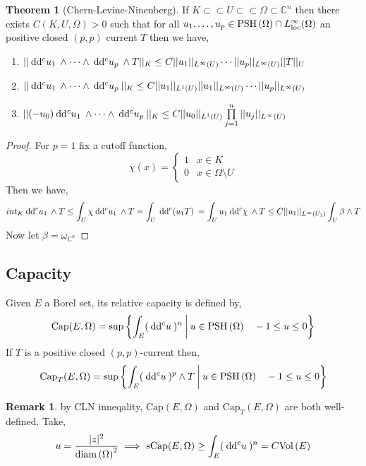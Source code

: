 \documentclass[12pt]{extarticle}
\newcommand{\C}{\mathbb{C}}
\renewcommand{\d}[1]{\: \mathrm{d}#1 \:}
\theoremstyle{definition}
\newtheorem{theorem}{Theorem}[section]
\newtheorem{remark}{Remark}
\newenvironment{definition}[1][Definition:]{\begin{trivlist}
\item[\hskip \labelsep {\bfseries #1}]}{\end{trivlist}}
\begin{document}
\begin{theorem}[Chern-Levine-Ninenberg]
If $K \subset \subset U \subset \subset \Omega \subset \C^n$ then there exists $C(K, U, \Omega) > 0$ such that for all $u_1, \dots, u_p \in \mathrm{PSH}\left( \Omega \right) \cap L^\infty_{\text{loc}}(\Omega)$ an positive closed $(p,p)$ current $T$ then we have,
\begin{enumerate}
\item $ || \d{\dc{u_1}} \wedge \cdots \wedge \d{\dc{u_p}} \wedge T ||_K \le C || u_1 ||_{L^\infty(U)} \cdots || u_p ||_{L^\infty(U)} ||T||_U$ 
\item $ || \d{\dc{u_1}} \wedge \cdots \wedge \d{\dc{u_p}} ||_K \le C || u_1 ||_{L^1(U)} || u_1 ||_{L^\infty(U)} \cdots || u_p ||_{L^\infty(U)}$
\item $ || (-u_0) \d{\dc{u_1}} \wedge \cdots \wedge \d{\dc{u_p}} ||_K \le C || u_0 ||_{L^1(U)} \prod\limits_{j = 1}^n || u_j ||_{L^\infty(U)}$
\end{enumerate}
\end{theorem}

\begin{proof}
For $p = 1$ fix a cutoff function,
\[ \chi(x) = \begin{cases}
1 & x \in K 
\\
0 & x \in \Omega \setminus U 
\end{cases} \]
Then we have,
\[ int_K \d{\dc{u_1}} \wedge T \le \int_U \chi \d{\dc{u_1}} \wedge T = \int_U \d{\dc{(u_1 T)}} = \int_U u_1 \d{\dc{\chi}} \wedge T \le C || u_1 ||_{L^\infty(U_1)} \int_U \beta \wedge T \]
Now let $\beta = \omega_{\C^n}$ 
\end{proof}


\subsection{Capacity}

\renewcommand{\Cap}{\mathrm{Cap}}

\begin{definition}
Given $E$ a Borel set, its relative capacity is defined by,
\[ \Cap(E, \Omega) = \sup \left\{ \int_E (\d{\dc{u}})^n \: \middle| \: u \in \PSH{\Omega} \quad -1 \le u \le 0 \right\} \]
If $T$ is a positive closed $(p,p)$-current then,
\[ \Cap_T(E, \Omega) = \sup \left\{ \int_E (\d{\dc{u}})^p \wedge T \: \middle| \: u \in \PSH{\Omega} \quad -1 \le u \le 0 \right\} \]
\end{definition}

\begin{remark}
by CLN inneqality, $\Cap(E, \Omega)$ and $\Cap_T(E, \Omega)$ are both well-defined. Take,
\[ u = \frac{|z|^2}{\diam{\Omega}^2} \implies s\Cap(E, \Omega) \ge \int_E (\d{\dc{u}})^n = C \Vol{E} \]
\end{remark}
\end{document}
